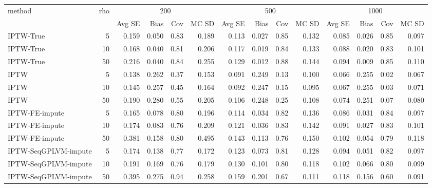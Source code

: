 \begin{tabular}{l r|rrrr|rrrr|rrrr}
\toprule
method & rho & \multicolumn{4}{c|}{200} & \multicolumn{4}{c|}{500} & \multicolumn{4}{c}{1000} \\
 &  & Avg SE & Bias & Cov & MC SD & Avg SE & Bias & Cov & MC SD & Avg SE & Bias & Cov & MC SD \\
\midrule
IPTW-True & 5 & 0.159 & 0.050 & 0.83 & 0.189 & 0.113 & 0.027 & 0.85 & 0.132 & 0.085 & 0.026 & 0.85 & 0.097 \\
IPTW-True & 10 & 0.168 & 0.040 & 0.81 & 0.206 & 0.117 & 0.019 & 0.84 & 0.133 & 0.088 & 0.020 & 0.83 & 0.101 \\
IPTW-True & 50 & 0.216 & 0.040 & 0.84 & 0.255 & 0.129 & 0.012 & 0.88 & 0.144 & 0.094 & 0.009 & 0.85 & 0.110 \\
IPTW & 5 & 0.138 & 0.262 & 0.37 & 0.153 & 0.091 & 0.249 & 0.13 & 0.100 & 0.066 & 0.255 & 0.02 & 0.067 \\
IPTW & 10 & 0.145 & 0.257 & 0.45 & 0.164 & 0.092 & 0.247 & 0.15 & 0.095 & 0.067 & 0.255 & 0.03 & 0.071 \\
IPTW & 50 & 0.190 & 0.280 & 0.55 & 0.205 & 0.106 & 0.248 & 0.25 & 0.108 & 0.074 & 0.251 & 0.07 & 0.080 \\
IPTW-FE-impute & 5 & 0.165 & 0.078 & 0.80 & 0.196 & 0.114 & 0.034 & 0.82 & 0.136 & 0.086 & 0.031 & 0.84 & 0.097 \\
IPTW-FE-impute & 10 & 0.174 & 0.083 & 0.76 & 0.209 & 0.121 & 0.036 & 0.83 & 0.142 & 0.091 & 0.027 & 0.83 & 0.101 \\
IPTW-FE-impute & 50 & 0.381 & 0.158 & 0.80 & 0.495 & 0.143 & 0.113 & 0.76 & 0.150 & 0.102 & 0.054 & 0.79 & 0.118 \\
IPTW-SeqGPLVM-impute & 5 & 0.174 & 0.138 & 0.77 & 0.172 & 0.123 & 0.073 & 0.81 & 0.128 & 0.094 & 0.051 & 0.82 & 0.097 \\
IPTW-SeqGPLVM-impute & 10 & 0.191 & 0.169 & 0.76 & 0.179 & 0.130 & 0.101 & 0.80 & 0.118 & 0.102 & 0.066 & 0.80 & 0.099 \\
IPTW-SeqGPLVM-impute & 50 & 0.395 & 0.275 & 0.94 & 0.258 & 0.159 & 0.201 & 0.67 & 0.111 & 0.118 & 0.156 & 0.60 & 0.091 \\
\bottomrule
\end{tabular}